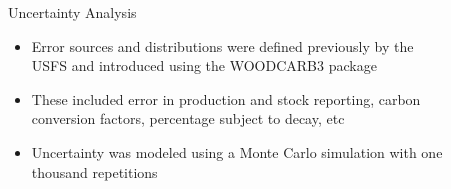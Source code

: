 \documentclass[final]{beamer}\usepackage[]{graphicx}\usepackage[]{color}
\newlength{\sepwid}
\newlength{\onecolwid}
\newlength{\twocolwid}
\begin{document}
\begin{frame}[t]
\begin{columns}[t]
\begin{column}{\onecolwid}
\end{column} %

\begin{column}{\sepwid}\end{column} %

\begin{column}{\twocolwid} %

\begin{columns}[t,totalwidth=\twocolwid] %

\begin{column}{\onecolwid}\vspace{-.6in} %



\begin{block}{Uncertainty Analysis}
\begin{itemize}
\item Error sources and distributions were defined previously by the USFS and introduced using the WOODCARB3 package
\item These included error in production and stock reporting, carbon conversion factors, percentage subject to decay, etc
\item Uncertainty was modeled using a Monte Carlo simulation with one thousand repetitions
\end{itemize}
\end{block}




\end{column} %

\begin{column}{\onecolwid}\vspace{-.6in} %


\end{column}
\end{columns}
\end{column}
\end{columns}
\end{frame}
\end{document}
